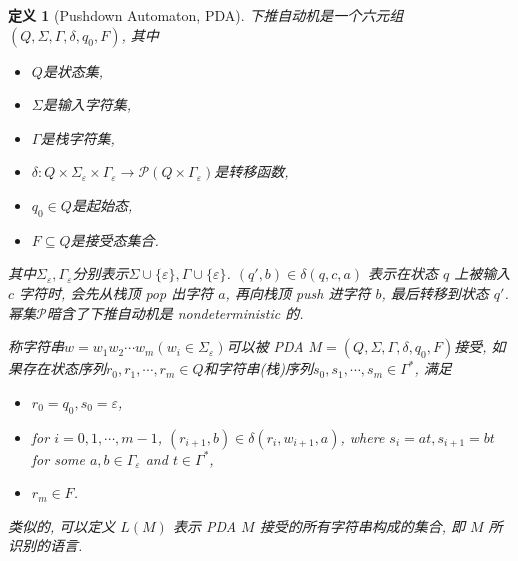 \documentclass[8pt]{article}
\theoremstyle{compact}
\newtheorem{definition}{定义}[section]
\begin{document}
\begin{definition}[Pushdown Automaton, PDA]
	下推自动机是一个六元组$(Q, \Sigma, \Gamma, \delta, q_0, F)$, 其中
	\begin{itemize}
		\item $Q$是状态集, 
		\item $\Sigma$是输入字符集, 
		\item $\Gamma$是栈字符集, 
		\item $\delta: Q \times \Sigma_{\varepsilon} \times \Gamma_{\varepsilon} \to \mathcal P(Q \times \Gamma_{\varepsilon})$是转移函数, 
		\item $q_0 \in Q$是起始态, 
		\item $F \subseteq Q$是接受态集合. 
	\end{itemize}

	其中$\Sigma_{\varepsilon}, \Gamma_{\varepsilon}$分别表示$\Sigma \cup \{\varepsilon\}, \Gamma \cup \{\varepsilon\}$. $(q', b) \in \delta(q, c, a)$ 表示在状态 $q$ 上被输入 $c$ 字符时, 会先从栈顶 pop 出字符 $a$, 再向栈顶 push 进字符 $b$, 最后转移到状态 $q'$. 幂集$\mathcal P$暗含了下推自动机是 nondeterministic 的. 

	称字符串$w = w_1w_2\cdots w_m(w_i \in \Sigma_{\varepsilon})$可以被 PDA $M = (Q, \Sigma, \Gamma, \delta, q_0, F)$接受, 如果存在状态序列$r_0, r_1, \cdots, r_m \in Q$和字符串(栈)序列$s_0, s_1, \cdots, s_m \in \Gamma^*$, 满足
	\begin{itemize}
		\item $r_0 = q_0, s_0 = \varepsilon$,
		\item for $i = 0, 1, \cdots, m-1$, $(r_{i+1}, b) \in \delta(r_i, w_{i+1}, a)$, where $s_i = at, s_{i+1}=bt$ for some $a, b \in \Gamma_{\varepsilon}$ and $t \in \Gamma^*$,
		\item $r_m \in F$.
	\end{itemize}

	类似的, 可以定义 $L(M)$ 表示 PDA $M$ 接受的所有字符串构成的集合, 即 $M$ 所识别的语言.
\end{definition}
\end{document}
